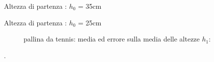 \documentclass[a4paper]{article}
\theoremstyle{definition}
\begin{document}
	\begin{table}[!ht]
		\centering
		
	\end{table}
	\noindent	Altezza di partenza : \(h_{0}\) = 35cm
		
	\begin{table}[!ht]
		\centering
		
	\end{table}
	\noindent	Altezza di partenza : \(h_{0}\) = 25cm
			
	\begin{table}[!ht]
		\centering
		
	\end{table}
	
	\begin{figure}[!htbp]
		\captionsetup{labelformat=empty}
			\caption{pallina da tennis: media ed errore sulla media delle altezze \(h_{1}\):}
	\end{figure}
	.\\\\\\\\\\\\\\\\\\\\\\
\end{document}
